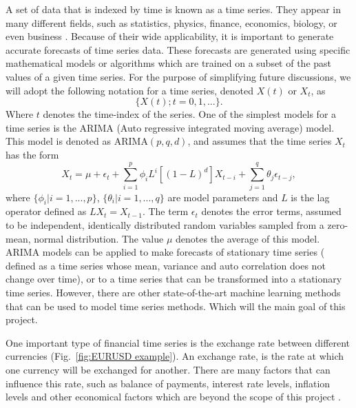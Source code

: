 \documentclass[10pt,a4paper]{article}
\begin{document}
A set of data that is indexed by time is known as a time series. They appear in many different fields, such as statistics, physics, finance, economics, biology, or even business \cite{Adhikari_2013}. Because of their wide applicability, it is important to generate accurate forecasts of time series data. These forecasts are generated using specific mathematical models or algorithms which are trained on a subset of the past values of a given time series. For the purpose of simplifying future discussions, we will adopt the following notation for a time series, denoted $X(t)$ or $X_t$, as
\begin{equation}
\lbrace X(t); t=0,1,... \rbrace.
\end{equation}
Where $t$ denotes the time-index of the series. One of the simplest models for a time series is the ARIMA (Auto regressive integrated moving average) model. This model is denoted as ARIMA$(p,q,d)$, and assumes that the time series $X_t$ has the form
\begin{equation}
X_{t} = \mu +\epsilon_t+ \sum_{i=1}^p \phi_i L^i \left[ (1-L)^d \right] X_{t-i} + \sum_{j=1}^q \theta_j \epsilon_{t-j},
\end{equation}  
where $\lbrace \phi_i | i=1,...,p \rbrace$, $\lbrace \theta_i | i=1,...,q \rbrace$ are model parameters and $L$ is the lag operator defined as $L X_t = X_{t-1} $. The term $\epsilon_{t}$ denotes the error terms, assumed to be independent, identically distributed random variables sampled from a zero-mean, normal distribution. The value $\mu$ denotes the average of this model. ARIMA models can be applied to make forecasts of stationary time series ( defined as a time series whose mean, variance and auto correlation does not change over time), or to a time series that can be transformed into a stationary time series. However, there are other state-of-the-art machine learning methods that can be used to model time series methods. Which will the main goal of this project.

One important type of financial time series is the exchange rate between different currencies (Fig.~\ref{fig:EURUSD example}). An exchange rate, is the rate at which one currency will be exchanged for another. There are many factors that can influence this rate, such as balance of payments, interest rate levels, inflation levels and other economical factors which are beyond the scope of this project \cite{Patel_2014}. %
\end{document}
